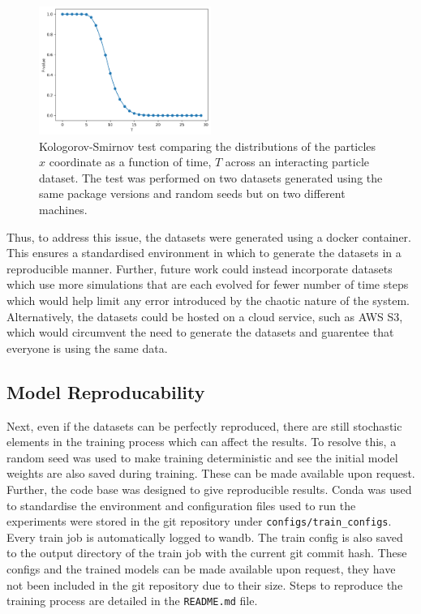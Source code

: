 \documentclass[11pt]{article}
\begin{document}
\begin{figure}[H]
    \centering
    \includegraphics[width=0.5\textwidth]{figs/ks_test.png}
    \caption{Kologorov-Smirnov test comparing the distributions of the particles $x$ coordinate as a function of time, $T$ across an interacting particle dataset. The test was performed on two datasets generated using the same package versions and random seeds but on two different machines.}
    \label{fig:ks_test}
\end{figure}
Thus, to address this issue, the datasets were generated using a docker container. This ensures a standardised environment in which to generate the datasets in a reproducible manner. Further, future work could instead incorporate datasets which use more simulations that are each evolved for fewer number of time steps which would help limit any error introduced by the chaotic nature of the system. Alternatively, the datasets could be hosted on a cloud service, such as AWS S3, which would circumvent the need to generate the datasets and guarentee that everyone is using the same data.

\subsection{Model Reproducability}
Next, even if the datasets can be perfectly reproduced, there are still stochastic elements in the training process which can affect the results. To resolve this, a random seed was used to make training deterministic and see the initial model weights are also saved during training. These can be made available upon request. Further, the code base was designed to give reproducible results. Conda was used to standardise the environment and configuration files used to run the experiments were stored in the git repository under \texttt{configs/train\_configs}. Every train job is automatically logged to wandb. The train config is also saved to the output directory of the train job with the current git commit hash. These configs and the trained models can be made available upon request, they have not been included in the git repository due to their size. Steps to reproduce the training process are detailed in the \texttt{README.md} file.
\end{document}
